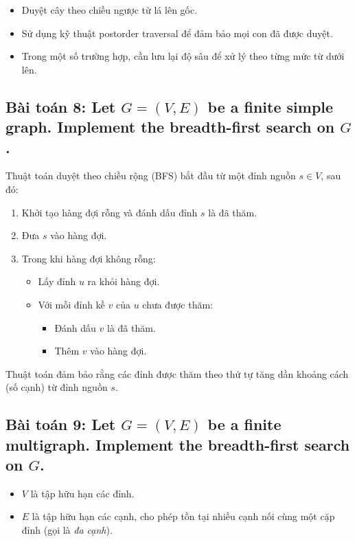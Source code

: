 \documentclass{article}
\begin{document}
	\begin{itemize}[itemsep=0.5em]
		\item Duyệt cây theo chiều ngược từ lá lên gốc.
		\item Sử dụng kỹ thuật postorder traversal để đảm bảo mọi con đã được duyệt.
		\item Trong một số trường hợp, cần lưu lại độ sâu để xử lý theo từng mức từ dưới lên.
	\end{itemize}
	
	\subsection*{Bài toán 8: Let $G = (V,E)$ be a finite simple graph. Implement the breadth-first search on $G$.}
	
	Thuật toán duyệt theo chiều rộng (BFS) bắt đầu từ một đỉnh nguồn $s \in V$, sau đó:
	
	\begin{enumerate}
		\item Khởi tạo hàng đợi rỗng và đánh dấu đỉnh $s$ là đã thăm.
		\item Đưa $s$ vào hàng đợi.
		\item Trong khi hàng đợi không rỗng:
		\begin{itemize}
			\item Lấy đỉnh $u$ ra khỏi hàng đợi.
			\item Với mỗi đỉnh kề $v$ của $u$ chưa được thăm:
			\begin{itemize}
				\item Đánh dấu $v$ là đã thăm.
				\item Thêm $v$ vào hàng đợi.
			\end{itemize}
		\end{itemize}
	\end{enumerate}
	
	Thuật toán đảm bảo rằng các đỉnh được thăm theo thứ tự tăng dần khoảng cách (số cạnh) từ đỉnh nguồn $s$.
	
	\subsection*{Bài toán 9: Let $G = (V,E)$ be a finite multigraph. Implement the breadth-first search on $G$.}
	
	\begin{itemize}
		\item $V$ là tập hữu hạn các đỉnh.
		\item $E$ là tập hữu hạn các cạnh, cho phép tồn tại nhiều cạnh nối cùng một cặp đỉnh (gọi là \textit{đa cạnh}).
	\end{itemize}
	
\end{document}
